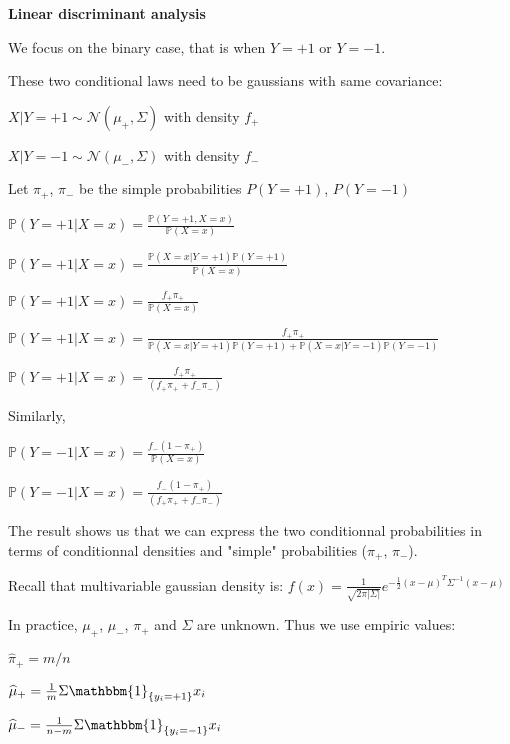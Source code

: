 {\fontsize{12pt}{22pt} \textbf{Linear discriminant analysis}\par}

\vspace{5mm}

We focus on the binary case, that is when $Y=+1$ or $Y=-1$.

These two conditional laws need to be gaussians with same covariance: \vspace{1mm}

$X | Y=+1 \sim \mathcal{N}(\mu_+,\Sigma)$ with density $f_+$

$X | Y=-1 \sim \mathcal{N}(\mu_-,\Sigma)$ with density $f_-$

Let $\pi_+$, $\pi_-$ be the simple probabilities $P(Y=+1)$, $P(Y=-1)$\vspace{3mm}

$ \mathbb{P}(Y=+1|X=x) = \frac{\mathbb{P}(Y=+1, X=x)}{\mathbb{P}(X=x)}$

$ \mathbb{P}(Y=+1|X=x) = \frac{\mathbb{P}(X=x|Y=+1) \mathbb{P}(Y=+1) }{\mathbb{P}(X=x) }$

$ \mathbb{P}(Y=+1|X=x) = \frac{f_+ \pi_+}{\mathbb{P}(X=x) }$

$ \mathbb{P}(Y=+1|X=x) = \frac{f_+ \pi_+}{\mathbb{P}(X=x|Y=+1)\mathbb{P}(Y= +1) + \mathbb{P}(X=x|Y=-1)\mathbb{P}(Y= -1) }$

$\mathbb{P}(Y=+1|X=x) = \frac{f_+ \pi_+}{(f_+\pi_+ + f_-\pi_-)}$

Similarly,

$ \mathbb{P}(Y=-1|X=x) = \frac{f_- (1-\pi_+)}{\mathbb{P}(X=x) }$

$\mathbb{P}(Y=-1|X=x) = \frac{f_- (1-\pi_+)}{(f_+\pi_+ + f_-\pi_-)}$

\vspace{3mm}

The result shows us that we can express the two conditionnal probabilities in terms of conditionnal densities and "simple" probabilities ($\pi_+$, $\pi_-$).

Recall that multivariable gaussian density is: $f(x)=\frac{1}{\sqrt{2 \pi |\Sigma|}}e^{-\frac{1}{2}(x-\mu)^T\Sigma^{-1}(x-\mu)}$

In practice, $\mu_+$, $\mu_-$, $\pi_+$ and $\Sigma$ are unknown. Thus we use empiric values:

$\widehat{\pi}_+ = m/n$

$\widehat{\mu}_+ = \frac{1}{m} \Sigma \mathbbm{1}_{\{y_i=+1\}}x_i$

$\widehat{\mu}_- = \frac{1}{n-m} \Sigma \mathbbm{1}_{\{y_i=-1\}}x_i$

